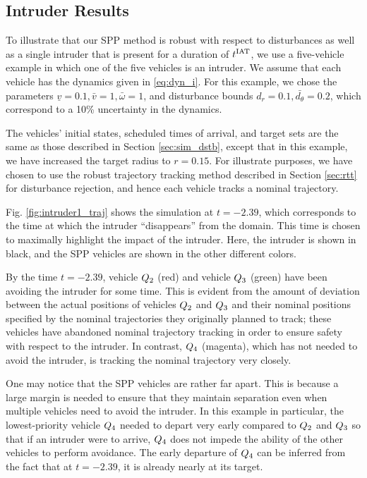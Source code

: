 \subsection{Intruder Results \label{sec:basic_results}}
To illustrate that our SPP method is robust with respect to disturbances as well as a single intruder that is present for a duration of $t^\text{IAT}$, we use a five-vehicle example in which one of the five vehicles is an intruder. We assume that each vehicle has the dynamics given in \eqref{eq:dyn_i}. For this example, we chose the parameters $\underline{v} = 0.1, \bar{v} = 1, \bar\omega = 1$, and disturbance bounds $d_{r} = 0.1, \bar{d_{\theta}} = 0.2$, which correspond to a 10\% uncertainty in the dynamics. 

The vehicles' initial states, scheduled times of arrival, and target sets are the same as those described in Section \ref{sec:sim_dstb}, except that in this example, we have increased the target radius to $r=0.15$. For illustrate purposes, we have chosen to use the robust trajectory tracking method described in Section \ref{sec:rtt} for disturbance rejection, and hence each vehicle tracks a nominal trajectory.

Fig. \ref{fig:intruder1_traj} shows the simulation at $t = -2.39$, which corresponds to the time at which the intruder ``disappears'' from the domain. This time is chosen to maximally highlight the impact of the intruder. Here, the intruder is shown in black, and the SPP vehicles are shown in the other different colors.

By the time $t = -2.39$, vehicle $Q_2$ (red) and vehicle $Q_3$ (green) have been avoiding the intruder for some time. This is evident from the amount of deviation between the actual positions of vehicles $Q_2$ and $Q_3$ and their nominal positions specified by the nominal trajectories they originally planned to track; these vehicles have abandoned nominal trajectory tracking in order to ensure safety with respect to the intruder. In contrast, $Q_4$ (magenta), which has not needed to avoid the intruder, is tracking the nominal trajectory very closely.

One may notice that the SPP vehicles are rather far apart. This is because a large margin is needed to ensure that they maintain separation even when multiple vehicles need to avoid the intruder. In this example in particular, the lowest-priority vehicle $Q_4$ needed to depart very early compared to $Q_2$ and $Q_3$ so that if an intruder were to arrive, $Q_4$ does not impede the ability of the other vehicles to perform avoidance. The early departure of $Q_4$ can be inferred from the fact that at $t=-2.39$, it is already nearly at its target.

